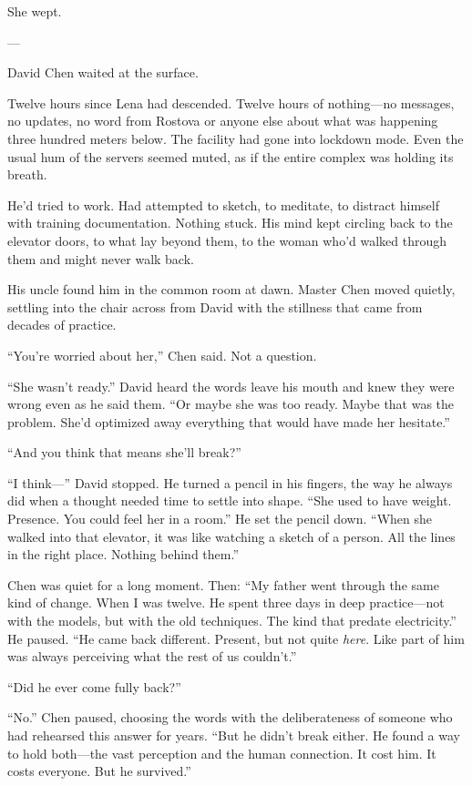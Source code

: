 She wept.

---

David Chen waited at the surface.

Twelve hours since Lena had descended. Twelve hours of nothing—no messages, no updates, no word from Rostova or anyone else about what was happening three hundred meters below. The facility had gone into lockdown mode. Even the usual hum of the servers seemed muted, as if the entire complex was holding its breath.

He'd tried to work. Had attempted to sketch, to meditate, to distract himself with training documentation. Nothing stuck. His mind kept circling back to the elevator doors, to what lay beyond them, to the woman who'd walked through them and might never walk back.

His uncle found him in the common room at dawn. Master Chen moved quietly, settling into the chair across from David with the stillness that came from decades of practice.

``You're worried about her,'' Chen said. Not a question.

``She wasn't ready.'' David heard the words leave his mouth and knew they were wrong even as he said them. ``Or maybe she was too ready. Maybe that was the problem. She'd optimized away everything that would have made her hesitate.''

``And you think that means she'll break?''

``I think—'' David stopped. He turned a pencil in his fingers, the way he always did when a thought needed time to settle into shape. ``She used to have weight. Presence. You could feel her in a room.'' He set the pencil down. ``When she walked into that elevator, it was like watching a sketch of a person. All the lines in the right place. Nothing behind them.''

Chen was quiet for a long moment. Then: ``My father went through the same kind of change. When I was twelve. He spent three days in deep practice—not with the models, but with the old techniques. The kind that predate electricity.'' He paused. ``He came back different. Present, but not quite \textit{here}. Like part of him was always perceiving what the rest of us couldn't.''

``Did he ever come fully back?''

``No.'' Chen paused, choosing the words with the deliberateness of someone who had rehearsed this answer for years. ``But he didn't break either. He found a way to hold both—the vast perception and the human connection. It cost him. It costs everyone. But he survived.''

